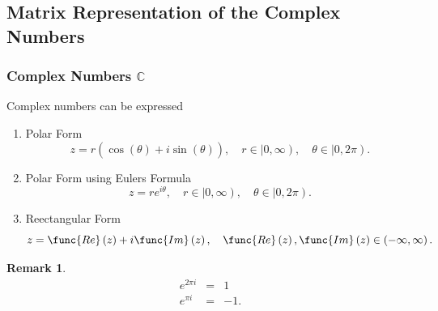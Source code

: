 \documentclass[aps,preprint]{revtex4}
\newtheorem{remark}[theorem]{Remark}
\begin{document}
\subsection{Matrix Representation of the Complex Numbers}

\subsubsection{Complex Numbers $\mathbb{C}$}

Complex numbers can be expressed

\begin{enumerate}
\item Polar Form%
\begin{equation*}
z=r\left( \overset{}{\cos \left( \theta \right) +i\sin \left( \theta \right) 
}\right) ,\quad r\in \left\vert 0,\infty \right) ,\quad \theta \in
\left\vert 0,2\pi \right) .
\end{equation*}

\item Polar Form using Eulers Formula%
\begin{equation}
z=re^{i\theta },\quad r\in \left\vert 0,\infty \right) ,\quad \theta \in
\left\vert 0,2\pi \right) .
\end{equation}

\item Reectangular Form 
\begin{equation}
z=\func{Re}\left( z\right) +i\func{Im}\left( z\right) ,\quad \func{Re}\left(
z\right) ,\func{Im}\left( z\right) \in \left( -\infty ,\infty \right) .
\end{equation}
\end{enumerate}

\begin{remark}
\begin{eqnarray}
e^{2\pi i} &=&1 \\
e^{\pi i} &=&-1.
\end{eqnarray}
\end{remark}
\end{document}
